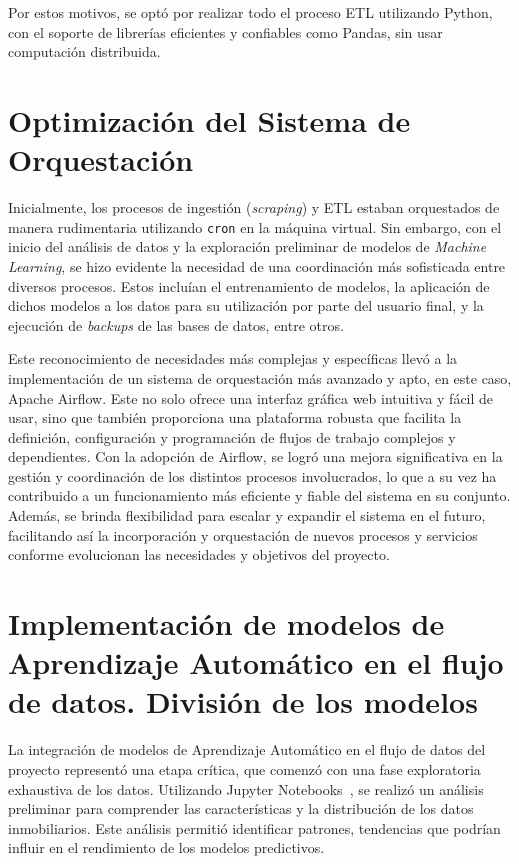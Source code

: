 Por estos motivos, se optó por realizar todo el proceso ETL utilizando Python, con el soporte de librerías eficientes y confiables como Pandas, sin usar computación distribuida.

\clearpage
\section{Optimización del Sistema de Orquestación}\label{sec:implementacion_airflow}

Inicialmente, los procesos de ingestión (\textit{scraping}) y ETL estaban orquestados de manera rudimentaria utilizando \texttt{cron} en la máquina virtual. Sin embargo, con el inicio del análisis de datos y la exploración preliminar de modelos de \textit{Machine Learning}, se hizo evidente la necesidad de una coordinación más sofisticada entre diversos procesos. Estos incluían el entrenamiento de modelos, la aplicación de dichos modelos a los datos para su utilización por parte del usuario final, y la ejecución de \textit{backups} de las bases de datos, entre otros.

Este reconocimiento de necesidades más complejas y específicas llevó a la implementación de un sistema de orquestación más avanzado y apto, en este caso, Apache Airflow. Este no solo ofrece una interfaz gráfica web intuitiva y fácil de usar, sino que también proporciona una plataforma robusta que facilita la definición, configuración y programación de flujos de trabajo complejos y dependientes. Con la adopción de Airflow, se logró una mejora significativa en la gestión y coordinación de los distintos procesos involucrados, lo que a su vez ha contribuido a un funcionamiento más eficiente y fiable del sistema en su conjunto. Además, se brinda flexibilidad para escalar y expandir el sistema en el futuro, facilitando así la incorporación y orquestación de nuevos procesos y servicios conforme evolucionan las necesidades y objetivos del proyecto.

\clearpage
\section{Implementación de modelos de Aprendizaje Automático en el flujo de datos. División de los modelos}\label{sec:divison_modelos}

La integración de modelos de Aprendizaje Automático en el flujo de datos del proyecto representó una etapa crítica, que comenzó con una fase exploratoria exhaustiva de los datos. Utilizando Jupyter Notebooks~\cite{jupyter}, se realizó un análisis preliminar para comprender las características y la distribución de los datos inmobiliarios. Este análisis permitió identificar patrones, tendencias que podrían influir en el rendimiento de los modelos predictivos.


